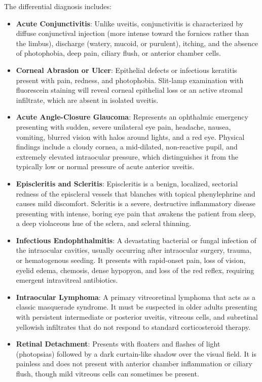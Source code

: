 The differential diagnosis includes:
\begin{itemize}
    \item \textbf{Acute Conjunctivitis}: Unlike uveitis, conjunctivitis is characterized by diffuse conjunctival injection (more intense toward the fornices rather than the limbus), discharge (watery, mucoid, or purulent), itching, and the absence of photophobia, deep pain, ciliary flush, or anterior chamber cells.
    \item \textbf{Corneal Abrasion or Ulcer}: Epithelial defects or infectious keratitis present with pain, redness, and photophobia. Slit-lamp examination with fluorescein staining will reveal corneal epithelial loss or an active stromal infiltrate, which are absent in isolated uveitis.
    \item \textbf{Acute Angle-Closure Glaucoma}: Represents an ophthalmic emergency presenting with sudden, severe unilateral eye pain, headache, nausea, vomiting, blurred vision with halos around lights, and a red eye. Physical findings include a cloudy cornea, a mid-dilated, non-reactive pupil, and extremely elevated intraocular pressure, which distinguishes it from the typically low or normal pressure of acute anterior uveitis.
    \item \textbf{Episcleritis and Scleritis}: Episcleritis is a benign, localized, sectorial redness of the episcleral vessels that blanches with topical phenylephrine and causes mild discomfort. Scleritis is a severe, destructive inflammatory disease presenting with intense, boring eye pain that awakens the patient from sleep, a deep violaceous hue of the sclera, and scleral thinning.
    \item \textbf{Infectious Endophthalmitis}: A devastating bacterial or fungal infection of the intraocular cavities, usually occurring after intraocular surgery, trauma, or hematogenous seeding. It presents with rapid-onset pain, loss of vision, eyelid edema, chemosis, dense hypopyon, and loss of the red reflex, requiring emergent intravitreal antibiotics.
    \item \textbf{Intraocular Lymphoma}: A primary vitreoretinal lymphoma that acts as a classic masquerade syndrome. It must be suspected in older adults presenting with persistent intermediate or posterior uveitis, vitreous cells, and subretinal yellowish infiltrates that do not respond to standard corticosteroid therapy.
    \item \textbf{Retinal Detachment}: Presents with floaters and flashes of light (photopsias) followed by a dark curtain-like shadow over the visual field. It is painless and does not present with anterior chamber inflammation or ciliary flush, though mild vitreous cells can sometimes be present.
\end{itemize}

